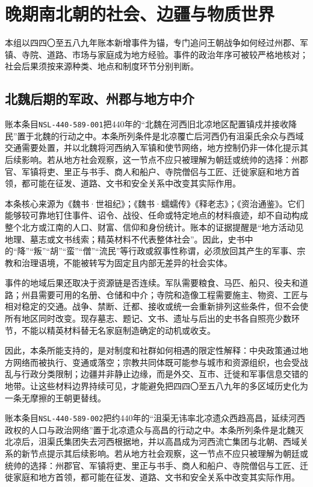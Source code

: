 \section{晚期南北朝的社会、边疆与物质世界}

\label{sec:late-ns-social-frontier-material-dossiers}

本组以四四〇至五八九年账本新增事件为锚，专门追问王朝战争如何经过州郡、军镇、寺院、道路、市场与家庭成为地方经验。事件的政治年序可被较严格地核对；社会后果须按来源种类、地点和制度环节分别判断。

\subsection{北魏后期的军政、州郡与地方中介}

账本条目\texttt{NSL-440-589-001}把440年的“北魏在河西旧北凉地区配置镇戍并接收降民”置于北魏的行动之中。本条所列条件是北凉覆亡后河西仍有沮渠氏余众与西域交通需要处置，并以北魏将河西纳入军镇和使节网络，地方控制仍非一体化提示其后续影响。若从地方社会观察，这一节点不应只被理解为朝廷或统帅的选择：州郡官、军镇将吏、里正与书手、商人和船户、寺院僧侣与工匠、迁徙家庭和地方首领，都可能在征发、道路、文书和安全关系中改变其实际作用。

本条核心来源为《魏书·世祖纪》；《魏书·蠕蠕传》《释老志》；《资治通鉴》。它们能够较可靠地钉住事件、诏令、战役、任命或特定地点的材料痕迹，却不自动构成整个北方或江南的人口、财富、信仰和身份统计。账本的证据提醒是“地方活动见地理、墓志或文书线索；精英材料不代表整体社会”。因此，史书中的“降”“叛”“胡”“蛮”“僧”“流民”等行政或叙事性称谓，必须放回其产生的军事、宗教和治理语境，不能被转写为固定且内部无差异的社会实体。

事件的地域后果还取决于资源链是否连续。军队需要粮食、马匹、船只、役夫和道路；州县需要可用的名册、仓储和中介；寺院和造像工程需要施主、物资、工匠与相对稳定的交通。战争、禁断、迁都、接收或统一会重新排列这些条件，但不会使所有地区同时改变。现存墓志、题记、文书、遗址与后出的史书各自照亮少数环节，不能以精英材料替无名家庭制造确定的动机或收支。

因此，本条所能支持的，是对制度和社群如何相遇的限定性解释：中央政策通过地方网络而被执行、变通或落空；宗教共同体既可能参与城市和资源组织，也会受战乱与行政分类限制；边疆并非静止边缘，而是外交、互市、迁徙和军事信息交错的地带。让这些材料边界持续可见，才能避免把四四〇至五八九年的多区域历史化为一条无摩擦的王朝更替线。

账本条目\texttt{NSL-440-589-002}把约440年的“沮渠无讳率北凉遗众西趋高昌，延续河西政权的人口与政治网络”置于北凉遗众与高昌的行动之中。本条所列条件是北魏灭北凉后，沮渠氏集团失去河西根据地，并以高昌成为河西流亡集团与北朝、西域关系的新节点提示其后续影响。若从地方社会观察，这一节点不应只被理解为朝廷或统帅的选择：州郡官、军镇将吏、里正与书手、商人和船户、寺院僧侣与工匠、迁徙家庭和地方首领，都可能在征发、道路、文书和安全关系中改变其实际作用。

